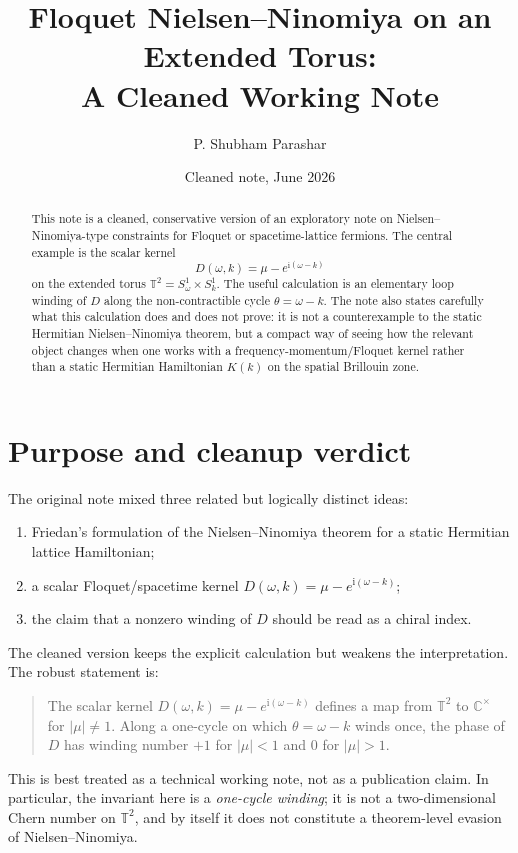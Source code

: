 \documentclass[11pt]{article}
\title{Floquet Nielsen--Ninomiya on an Extended Torus:\\A Cleaned Working Note}
\author{P. Shubham Parashar}
\date{Cleaned note, June 2026}
\newcommand{\ii}{\mathrm{i}}
\newcommand{\TT}{\mathbb{T}}
\newcommand{\CC}{\mathbb{C}}
\begin{document}
\maketitle

\begin{abstract}
This note is a cleaned, conservative version of an exploratory note on Nielsen--Ninomiya-type constraints for Floquet or spacetime-lattice fermions.  The central example is the scalar kernel
\[
  D(\omega,k)=\mu-e^{\ii(\omega-k)}
\]
on the extended torus \(\TT^2=S^1_\omega\times S^1_k\).  The useful calculation is an elementary loop winding of \(D\) along the non-contractible cycle \(\theta=\omega-k\).  The note also states carefully what this calculation does and does not prove: it is not a counterexample to the static Hermitian Nielsen--Ninomiya theorem, but a compact way of seeing how the relevant object changes when one works with a frequency-momentum/Floquet kernel rather than a static Hermitian Hamiltonian \(K(k)\) on the spatial Brillouin zone.
\end{abstract}

\section{Purpose and cleanup verdict}

The original note mixed three related but logically distinct ideas:
\begin{enumerate}[label=(\roman*)]
  \item Friedan's formulation of the Nielsen--Ninomiya theorem for a static Hermitian lattice Hamiltonian;
  \item a scalar Floquet/spacetime kernel \(D(\omega,k)=\mu-e^{\ii(\omega-k)}\);
  \item the claim that a nonzero winding of \(D\) should be read as a chiral index.
\end{enumerate}

The cleaned version keeps the explicit calculation but weakens the interpretation.  The robust statement is:

\begin{quote}
The scalar kernel \(D(\omega,k)=\mu-e^{\ii(\omega-k)}\) defines a map from \(\TT^2\) to \(\CC^\times\) for \(|\mu|\neq1\).  Along a one-cycle on which \(\theta=\omega-k\) winds once, the phase of \(D\) has winding number \(+1\) for \(|\mu|<1\) and \(0\) for \(|\mu|>1\).
\end{quote}

This is best treated as a technical working note, not as a publication claim.  In particular, the invariant here is a \emph{one-cycle winding}; it is not a two-dimensional Chern number on \(\TT^2\), and by itself it does not constitute a theorem-level evasion of Nielsen--Ninomiya.
\end{document}
